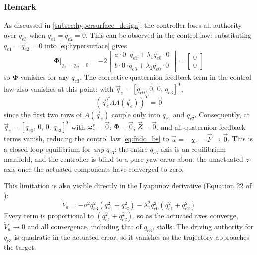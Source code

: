 \subsubsection*{Remark}

As discussed in \autoref{subsec:hypersurface_design}, the controller loses all authority over $q_{e3}$ when $q_{e1} = q_{e2} = 0$. This can be observed in the control law: substituting $q_{e1} = q_{e2} = 0$ into \autoref{eq:hypersurface} gives
\begin{equation}
    \boldsymbol{\Phi}\big|_{q_{e1}=q_{e2}=0}
    = -2\begin{bmatrix}
        a \cdot 0 \cdot q_{e3} + \lambda_1 q_{e0} \cdot 0 \\
        b \cdot 0 \cdot q_{e3} + \lambda_2 q_{e0} \cdot 0
    \end{bmatrix}
    = \begin{bmatrix} 0 \\ 0 \end{bmatrix}
\end{equation}
so $\boldsymbol{\Phi}$ vanishes for any $q_{e3}$. The corrective quaternion feedback term in the
control law also vanishes at this point: with $\vec{q}_e = [q_{e0},\,0,\,0,\,q_{e3}]^T$,
\begin{equation}
    \left(\vec{q}_e^T \Lambda A(\vec{q}_e)\right)^T = \vec{0}
\end{equation}
since the first two rows of $A(\vec{q}_e)$ couple only into $q_{e1}$ and $q_{e2}$.
Consequently, at $\vec{q}_e = [q_{e0},\,0,\,0,\,q_{e3}]^T$ with $\boldsymbol{\omega}^r_e = \vec{0}$:
$\boldsymbol{\Phi} = \vec{0}$, $\vec{Z} = \vec{0}$, and all quaternion feedback terms vanish,
reducing the control law \autoref{eq:fndo_bs} to
$\vec{u} = -\boldsymbol{\chi}_1 - \vec{F} \to \vec{0}$.
This is a closed-loop equilibrium for \emph{any} $q_{e3}$: the entire $q_{e3}$-axis is an
equilibrium manifold, and the controller is blind to a pure yaw error about
the unactuated $z$-axis once the actuated components have converged to zero.

This limitation is also visible directly in the Lyapunov derivative
(Equation 22 of \cite{nadafiRobustBacksteppingAttitude2021}):
\begin{equation}
    \dot{V}_a
    = -a^2 q_{e3}^2\!\left(q_{e1}^2 + q_{e2}^2\right)
      - \lambda_1^2 q_{e0}^2\!\left(q_{e1}^2 + q_{e2}^2\right)
    \label{eq:Vadot}
\end{equation}
Every term is proportional to $\left(q_{e1}^2 + q_{e2}^2\right)$, so as the actuated axes
converge, $\dot{V}_a \to 0$ and all convergence, including that of $q_{e3}$, stalls.
The driving authority for $q_{e3}$ is quadratic in the actuated error, so it vanishes as the trajectory approaches the target.

